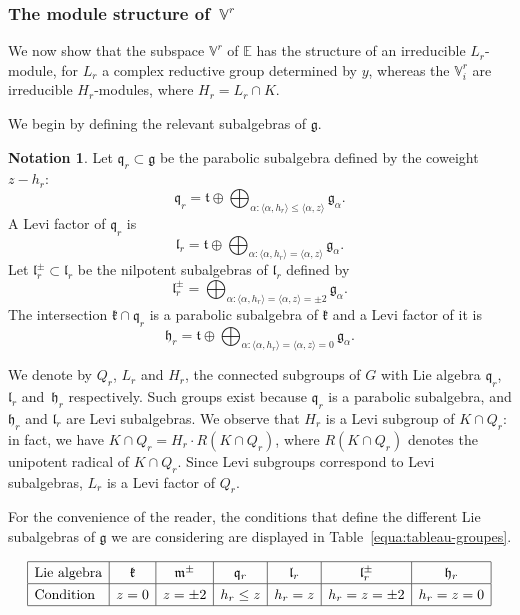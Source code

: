 \documentclass[JEP,XML,SOM,Unicode,NoFloatCountersInSection]{cedram}
\theoremstyle{plain}
\theoremstyle{definition}
\newtheorem{nota}[theo]{Notation}
\let\rgy r
\newcommand{\bE}{\mathbb{E}}
\newcommand{\Vr}{\mathbb{V}^\rgy}
\newcommand{\fgg}{\mathfrak{g}}
\newcommand{\fh}{\mathfrak{h}}
\newcommand{\fk}{\mathfrak{k}}
\newcommand{\fl}{\mathfrak{l}}
\newcommand{\fm}{\mathfrak{m}}
\newcommand{\fq}{\mathfrak{q}}
\newcommand{\ft}{\mathfrak{t}}
\newcommand{\scal}[1]{\langle #1 \rangle}
\begin{document}
\subsubsection{The module structure of $\,\Vr$}

We now show that the subspace $\Vr$ of $\bE$ has the structure of an irreducible $L_\rgy$-module, for
$L_\rgy$ a complex reductive group
determined by $y$, whereas the $\Vr_i$ are irreducible $H_\rgy$-modules, where $H_\rgy=L_\rgy\cap K$.

We begin by defining the relevant subalgebras of $\fgg$.

\begin{nota}\label{defi:qlh}
Let $\fq_\rgy \subset \fgg$ be the parabolic subalgebra defined by the coweight $z-h_\rgy$:
$$ \fq_\rgy = \ft \oplus \bigoplus_{\alpha:\scal{\alpha,h_\rgy} \leq \scal{\alpha,z}} \fgg_\alpha . $$
A Levi factor of $\fq_\rgy$ is
$$\fl_\rgy=\ft \oplus \bigoplus_{\alpha:\scal{\alpha,h_\rgy} = \scal{\alpha,z}} \fgg_\alpha . $$
Let $\fl_\rgy^\pm \subset \fl_\rgy$ be the nilpotent subalgebras of $\fl_\rgy$ defined by
$$\fl_\rgy^\pm = \bigoplus_{\alpha:\scal{\alpha,h_\rgy} = \scal{\alpha,z} = \pm 2} \fgg_\alpha . $$
The intersection $\fk\cap\fq_\rgy$ is a parabolic subalgebra of $\fk$ and a Levi factor of it is
$$\fh_\rgy = \ft \oplus \bigoplus_{\alpha:\scal{\alpha,h_\rgy} = \scal{\alpha,z}=0} \fgg_\alpha .$$

We denote by $Q_\rgy$, $L_\rgy$ and $H_\rgy$, the connected subgroups of $G$ with
Lie algebra $\fq_\rgy$,~$\fl_\rgy$ and~$\fh_\rgy$ respectively. Such groups exist because $\fq_\rgy$ is a parabolic subalgebra, and
$\fh_\rgy$ and $\fl_\rgy$ are Levi subalgebras.
We observe that
$H_\rgy$ is a Levi subgroup of $K \cap Q_\rgy$: in fact, we have $K\cap Q_\rgy = H_\rgy \cdot R(K \cap Q_\rgy)$, where
$R(K \cap Q_\rgy)$ denotes the unipotent
radical of $K \cap Q_\rgy$. Since Levi subgroups correspond to Levi subalgebras,
$L_\rgy$ is a Levi factor of $Q_\rgy$.
\end{nota}

For the convenience of the reader, the conditions that define the different Lie subalgebras of $\fgg$
we are
considering are displayed in Table~\ref{equa:tableau-groupes}.

\begin{table}[ht]
$$\arraycolsep5pt\renewcommand{\arraystretch}{1.3}
\begin{array}{|l|c|c|c|c|c|c|}
\hline \mbox{Lie algebra} & \fk & \fm^\pm & \fq_\rgy & \fl_\rgy & \fl_\rgy^\pm & \fh_\rgy \\
\hline \mbox{Condition} & z=0 & z = \pm 2 & h_\rgy \leq z & h_\rgy=z & h_\rgy=z=\pm 2 & h_\rgy=z=0 \\
\hline
\end{array}
$$
\caption{\smaller Lie subalgebras under consideration (We abbreviate the condition
$\scal{\alpha,z}=0$,
\resp $\scal{\alpha,h_\rgy}=0$, on a root $\alpha$ as $z=0$, \resp $h_\rgy=0$.)}\label{equa:tableau-groupes}
\end{table}
\end{document}
